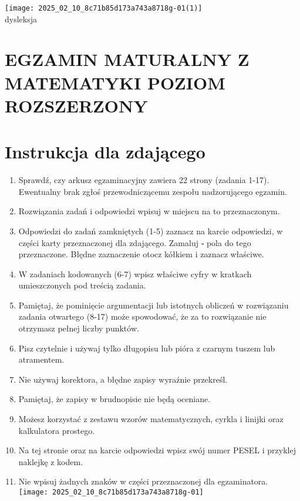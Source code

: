 \documentclass[10pt]{article}
\author{Data: \(\mathbf{3}\) czerwca 2016 r.\\
Godzina rozpoczeqia: 14:00\\
CZAS PRACY: \(\mathbf{1 8 0}\) minut\\
LicZba punktów do uzyskania: 50}
\date{}
\begin{document}
\maketitle
\texttt{[image: 2025\_02\_10\_8c71b85d173a743a8718g-01(1)]}\\
dysleksja

\section*{EGZAMIN MATURALNY Z MATEMATYKI POZIOM ROZSZERZONY}


\section*{Instrukcja dla zdającego}
\begin{enumerate}
  \item Sprawdź, czy arkusz egzaminacyjny zawiera 22 strony (zadania 1-17). Ewentualny brak zgłoś przewodniczącemu zespołu nadzorującego egzamin.
  \item Rozwiązania zadań i odpowiedzi wpisuj w miejscu na to przeznaczonym.
  \item Odpowiedzi do zadań zamkniętych (1-5) zaznacz na karcie odpowiedzi, w części karty przeznaczonej dla zdającego. Zamaluj \(\square\) pola do tego przeznaczone. Błędne zaznaczenie otocz kółkiem i zaznacz właściwe.
  \item W zadaniach kodowanych (6-7) wpisz właściwe cyfry w kratkach umieszczonych pod treścią zadania.
  \item Pamiętaj, że pominięcie argumentacji lub istotnych obliczeń w rozwiązaniu zadania otwartego (8-17) może spowodować, że za to rozwiązanie nie otrzymasz pełnej liczby punktów.
  \item Pisz czytelnie i używaj tylko długopisu lub pióra z czarnym tuszem lub atramentem.
  \item Nie używaj korektora, a błędne zapisy wyraźnie przekreśl.
  \item Pamiętaj, że zapisy w brudnopisie nie będą oceniane.
  \item Możesz korzystać z zestawu wzorów matematycznych, cyrkla i linijki oraz kalkulatora prostego.
  \item Na tej stronie oraz na karcie odpowiedzi wpisz swój numer PESEL i przyklej naklejkę z kodem.
  \item Nie wpisuj żadnych znaków w części przeznaczonej dla egzaminatora.\\
\texttt{[image: 2025\_02\_10\_8c71b85d173a743a8718g-01]}
\end{enumerate}
\end{document}
